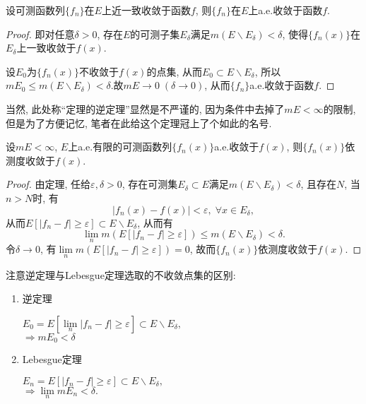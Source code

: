 \vskip 0.2cm
\begin{theorem}
	设可测函数列$\{ f_n \}$在$E$上近一致收敛于函数$f$, 则$\{ f_n \}$在$E$上a.e.收敛于函数$f$. 
\end{theorem}

\begin{proof}
	即对任意$\delta > 0$, 存在$E$的可测子集$E_{\delta}$满足$m (E \backslash E_{\delta} ) < \delta$, 使得$\{ f_n(x) \}$在$E_{\delta}$上一致收敛于$f(x)$. 

	设$E_0$为$\{ f_n(x) \}$不收敛于$f(x)$的点集, 从而$E_0 \subset E \backslash E_{\delta}$, 所以$m E_0 \leq m(E \backslash E_{\delta}) < \delta$.故$m E \to 0\; (\delta \to 0)$, 从而$\{ f_n \}$a.e.收敛于函数$f$. 
\end{proof}

\vskip 0.2cm
当然, 此处称“\ru{}定理的逆定理”显然是不严谨的, 
因为条件中去掉了$m E < \infty$的限制, 
但是为了方便记忆, 笔者在此给这个定理冠上了个如此的名号.

\vskip 0.2cm
\begin{theorem}[Lebesgue定理]
	设$m E < \infty$, $E$上a.e.有限的可测函数列$\{ f_n(x) \}$a.e.收敛于$f(x)$, 则$\{ f_n (x) \}$依测度收敛于$f(x)$.
\end{theorem}

\begin{proof}
	由\ru{}定理, 任给$\varepsilon, \delta > 0$, 存在可测集$E_{\delta} \subset E$满足$m(E \backslash E_{\delta}) < \delta$, 且存在$N$, 当$n > N$时, 有
		$$
			|f_n(x) - f(x)| < \varepsilon,\; \forall x \in E_{\delta},
		$$
	从而$E \left[ |f_n - f| \geq \varepsilon \right] \subset E \backslash E_{\delta}$, 从而有
		$$
			\lim\limits_n m(E \left[ |f_n - f| \geq \varepsilon \right]) \leq m(E \backslash E_{\delta}) < \delta.
		$$
	令$\delta \to 0$, 有$\lim\limits_n m(E \left[ |f_n - f| \geq \varepsilon \right]) = 0$, 故而$\{ f_n (x) \}$依测度收敛于$f(x)$.
\end{proof}

\begin{note}
	注意\ru{}逆定理与Lebesgue定理选取的不收敛点集的区别:
	\begin{enumerate}
		\item \ru{}逆定理
			\begin{center}
				$E_0 = E\left[ \lim\limits_n |f_n - f| \geq \varepsilon \right] \subset E \backslash E_{\delta},$ \\
				$\Rightarrow m E_0 <\delta$
			\end{center}
		\item Lebesgue定理
			\begin{center}
				$E_n = E\left[ |f_n - f| \geq \varepsilon \right] \subset E \backslash E_{\delta},$ \\
				$\Rightarrow \lim\limits_n m E_n < \delta.$
			\end{center}
	\end{enumerate}
\end{note}

